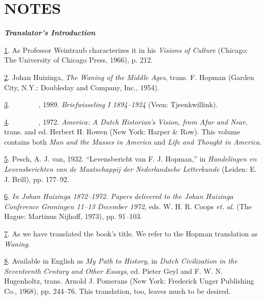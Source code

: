 \chapter{NOTES}

\textbf{\emph{Translator's Introduction}}

\protect\hypertarget{23_NOTES.xhtmlux5cux23id_2248}{\protect\hyperlink{05_TRANSLATOR_S_INTRODUCTION.xhtmlux5cux23id_2247}{1}}.
As Professor Weintraub characterizes it in his \emph{Visions of Culture}
(Chicago: The University of Chicago Press, 1966), p. 212.

\protect\hypertarget{23_NOTES.xhtmlux5cux23id_2246}{\protect\hyperlink{05_TRANSLATOR_S_INTRODUCTION.xhtmlux5cux23id_2245}{2}}.
Johan Huizinga, \emph{The Waning of the Middle Ages}, trans. F. Hopman
(Garden City, N.Y.: Doubleday and Company, Inc., 1954).

\protect\hypertarget{23_NOTES.xhtmlux5cux23id_2244}{\protect\hyperlink{05_TRANSLATOR_S_INTRODUCTION.xhtmlux5cux23id_2243}{3}}.{~~~~~~~~},
1989. \emph{Briefwisseling I 1894--1924} (Veen: Tjeenkwillink).

\protect\hypertarget{23_NOTES.xhtmlux5cux23id_2242}{\protect\hyperlink{05_TRANSLATOR_S_INTRODUCTION.xhtmlux5cux23id_2241}{4}}.{~~~~~~~~},
1972. \emph{America: A Dutch Historian's Vision, from Afar and Near},
trans. and ed. Herbert H. Rowen (New York: Harper \& Row). This volume
contains both \emph{Man and the Masses in America} and \emph{Life and
Thought in America}.

\protect\hypertarget{23_NOTES.xhtmlux5cux23id_2240}{\protect\hyperlink{05_TRANSLATOR_S_INTRODUCTION.xhtmlux5cux23id_2239}{5}}.
Pesch, A. J. van, 1932. ``Levensbericht van F. J. Hopman,'' in
\emph{Handelingen en Levensberichten van de Maatschappij der
Nederlandsche Letterkunde} (Leiden: E. J. Brill), pp. 177--92.

\protect\hypertarget{23_NOTES.xhtmlux5cux23id_2238}{\protect\hyperlink{05_TRANSLATOR_S_INTRODUCTION.xhtmlux5cux23id_2237}{6}}.
\emph{In Johan Huizinga 1872--1972. Papers delivered to the Johan
Huizinga Conference Groningen 11--13 December 1972}, eds. W. H. R. Coops
\emph{et. al}. (The Hague: Martinus Nijhoff, 1973), pp. 91--103.

\protect\hypertarget{23_NOTES.xhtmlux5cux23id_2236}{\protect\hyperlink{05_TRANSLATOR_S_INTRODUCTION.xhtmlux5cux23id_2235}{7}}.
As we have translated the book's title. We refer to the Hopman
translation as \emph{Waning}.

\protect\hypertarget{23_NOTES.xhtmlux5cux23id_2234}{\protect\hyperlink{05_TRANSLATOR_S_INTRODUCTION.xhtmlux5cux23id_2233}{8}}.
Available in English as \emph{My Path to History}, in \emph{Dutch
Civilization in the Seventeenth Century and Other Essays}, ed. Pieter
Geyl and F. W. N. Hugenholtz, trans. Arnold J. Pomerans (New York:
Frederick Unger Publishing Co., 1968), pp. 244--76. This translation,
too, leaves much to be desired.

